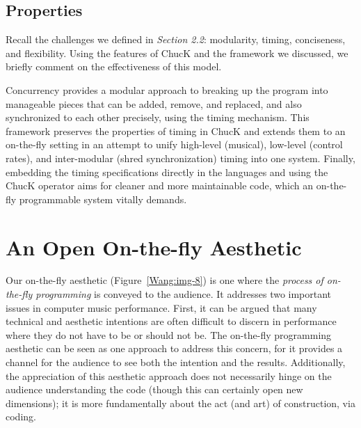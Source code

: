 \subsection{Properties}

Recall the challenges we defined in \textit{Section 2.2}: modularity, timing,
conciseness, and flexibility.  Using the features of ChucK and the framework we
discussed, we briefly comment on the effectiveness of this model.

Concurrency provides a modular approach to breaking up the program into
manageable pieces that can be added, remove, and replaced, and also synchronized
to each other precisely, using the timing mechanism.  This framework preserves
the properties of timing in ChucK and extends them to an on-the-fly setting in an
attempt to unify high-level (musical), low-level (control rates), and
inter-modular (shred synchronization) timing into one system.  Finally, embedding
the timing specifications directly in the languages and using the ChucK operator
aims for cleaner and more maintainable code, which an on-the-fly programmable
system vitally demands.

\section{An Open On-the-fly Aesthetic}

Our on-the-fly aesthetic (Figure~\ref{Wang:img-8}) is one where the \textit{process of
on-the-fly programming} is conveyed to the audience.  It addresses two important
issues in computer music performance.  First, it can be argued that many
technical and aesthetic intentions are often difficult to discern in performance
where they do not have to be or should not be.   The on-the-fly programming
aesthetic can be seen as one approach to address this concern, for it provides a
channel for the audience to see both the intention and the results. 
Additionally, the appreciation of this aesthetic approach does not necessarily
hinge on the audience understanding the code (though this can certainly open new
dimensions); it is more fundamentally about the act (and art) of construction,
via coding.


